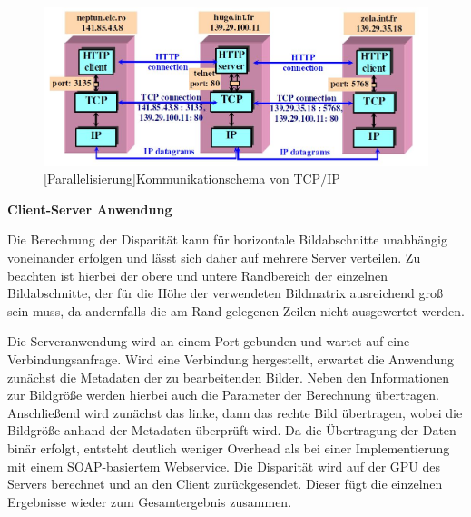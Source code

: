 \documentclass[times, 10pt,twocolumn]{article}
\begin{document}
 \begin{figure}[!ht]
	\centering
	\includegraphics[width=0.9\linewidth]{image/ip-tcp.jpg}
	[Parallelisierung]{Kommunikationschema von TCP/IP}
	\label{fig:gpu}
\end{figure}

\textbf{Client-Server Anwendung}

Die Berechnung der Disparität kann für horizontale Bildabschnitte unabhängig voneinander erfolgen und lässt sich daher auf mehrere Server verteilen. Zu beachten ist hierbei der obere und untere Randbereich der einzelnen Bildabschnitte, der für die Höhe der verwendeten Bildmatrix ausreichend groß sein muss, da andernfalls die am Rand gelegenen Zeilen nicht ausgewertet werden.

Die Serveranwendung wird an einem Port gebunden und wartet auf eine Verbindungsanfrage. Wird eine Verbindung hergestellt, erwartet die Anwendung zunächst die Metadaten der zu bearbeitenden Bilder. Neben den Informationen zur Bildgröße werden hierbei auch die Parameter der Berechnung übertragen. Anschließend wird zunächst das linke, dann das rechte Bild übertragen, wobei die Bildgröße anhand der Metadaten überprüft wird. Da die Übertragung der Daten binär erfolgt, entsteht deutlich weniger Overhead als bei einer Implementierung mit einem SOAP-basiertem Webservice. Die Disparität wird auf der GPU des Servers berechnet und an den Client zurückgesendet. Dieser fügt die einzelnen Ergebnisse wieder zum Gesamtergebnis zusammen.


\end{document}
